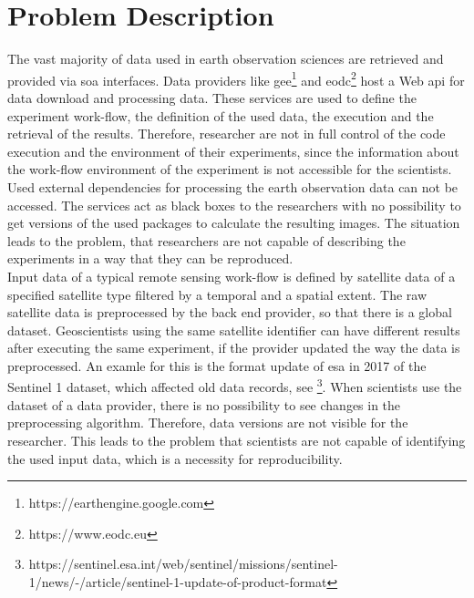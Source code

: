 \documentclass[draft,final]{vutinfth} %
\begin{document}
\section{Problem Description}\label{Problem}
The vast majority of data used in earth observation sciences are retrieved and provided via \gls{soa} interfaces. Data providers like \gls{gee}\footnote{https://earthengine.google.com} and \gls{eodc}\footnote{https://www.eodc.eu} host a Web \gls{api} for data download and processing data. These services are used to define the experiment work-flow, the definition of the used data, the execution and the retrieval of the results. Therefore, researcher are not in full control of the code execution and the environment of their experiments, since the information about the work-flow environment of the experiment is not accessible for the scientists. Used external dependencies for processing the earth observation data can not be accessed. The services act as black boxes to the researchers with no possibility to get versions of the used packages to calculate the resulting images. The situation leads to the problem, that researchers are not capable of describing the experiments in a way that they can be reproduced. \\
Input data of a typical remote sensing work-flow is defined by satellite data of a specified satellite type filtered by a temporal and a spatial extent. The raw satellite data is preprocessed by the back end provider, so that there is a global dataset. Geoscientists using the same satellite identifier can have different results after executing the same experiment, if the provider updated the way the data is preprocessed. An examle for this is the format update of \gls{esa} in 2017 of the Sentinel 1 dataset, which affected old data records, see \footnote{https://sentinel.esa.int/web/sentinel/missions/sentinel-1/news/-/article/sentinel-1-update-of-product-format}. When scientists use the dataset of a data provider, there is no possibility to see changes in the preprocessing algorithm. Therefore, data versions are not visible for the researcher. This leads to the problem that scientists are not capable of identifying the used input data, which is a necessity for reproducibility. 
\end{document}
